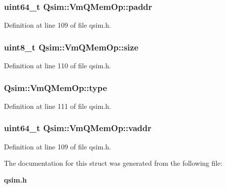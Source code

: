 \subsubsection[{paddr}]{\setlength{\rightskip}{0pt plus 5cm}uint64\_\-t {\bf Qsim::VmQMemOp::paddr}}\label{structQsim_1_1VmQMemOp_291b6e2d4e0592933eb2638520b1395e}




Definition at line 109 of file qsim.h.
\subsubsection[{size}]{\setlength{\rightskip}{0pt plus 5cm}uint8\_\-t {\bf Qsim::VmQMemOp::size}}\label{structQsim_1_1VmQMemOp_6e161d6ad6e0818f4a8624236e60b4d1}




Definition at line 110 of file qsim.h.
\subsubsection[{type}]{ {\bf Qsim::VmQMemOp::type}}\label{structQsim_1_1VmQMemOp_cb5a968319c5456960d65c84ab92233b}




Definition at line 111 of file qsim.h.
\subsubsection[{vaddr}]{\setlength{\rightskip}{0pt plus 5cm}uint64\_\-t {\bf Qsim::VmQMemOp::vaddr}}\label{structQsim_1_1VmQMemOp_afb4e17cff97f262f9b329326386b89d}




Definition at line 109 of file qsim.h.

The documentation for this struct was generated from the following file:\begin{CompactItemize}
\item 
{\bf qsim.h}\end{CompactItemize}
